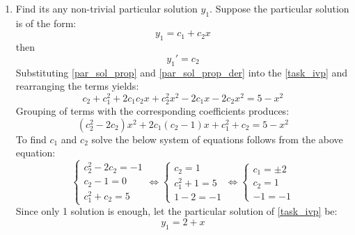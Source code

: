 \documentclass[12pt,a4paper,titlepage]{article}
\begin{document}
  \begin{enumerate}
    \item Find its any non-trivial particular solution $y_1$. Suppose the particular solution is of the form: 
    \begin{equation} \label{par_sol_prop}
      y_1 = c_1 + c_2 x
    \end{equation}
    then
    \begin{equation} \label{par_sol_prop_der}
      y_1' = c_2
    \end{equation}
    Substituting \eqref{par_sol_prop} and \eqref{par_sol_prop_der} into the \eqref{task_ivp} and rearranging the terms yields:
    \begin{equation*}
      c_2 + c_1^2 + 2c_1c_2x + c_2^2 x^2 - 2c_1x - 2c_2 x^2 = 5 - x^2
    \end{equation*}
    Grouping of terms with the corresponding coefficients produces:
    \begin{equation*}
      (c_2^2 - 2c_2)x^2 + 2c_1(c_2 - 1)x + c_1^2 + c_2 = 5 - x^2
    \end{equation*}
    To find $c_1$ and $c_2$ solve the below system of equations follows from the above equation:
    \begin{equation*}
      \begin{cases}
        c_2^2 - 2c_2 = -1\\
        c_2 - 1 = 0\\
        c_1^2 + c_2 = 5
      \end{cases}
      \iff
      \begin{cases}
        c_2 = 1\\
        c_1^2 + 1 = 5\\
        1 - 2 = -1
      \end{cases}
      \iff
      \begin{cases}
        c_1 = \pm 2\\
        c_2 = 1\\
        -1 = -1
      \end{cases}
    \end{equation*}
    Since only 1 solution is enough, let the particular solution of \eqref{task_ivp} be:
    \begin{equation} \label{par_sol}
      y_1 = 2 + x
    \end{equation}


\end{enumerate}
\end{document}
